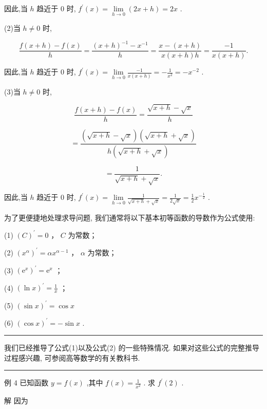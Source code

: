 \documentclass[10pt]{article}
\newcommand{\HRule}{\begin{center}\rule{0.9\linewidth}{0.2mm}\end{center}}
\begin{document}
因此,当 \(h\) 趋近于 0 时, \({f}^{\prime }\left( x\right)  = \mathop{\lim }\limits_{{h \rightarrow  0}}\left( {{2x} + h}\right)  = {2x}\) .

(2)当 \(h \neq  0\) 时,

\[
\frac{f\left( {x + h}\right)  - f\left( x\right) }{h} = \frac{{\left( x + h\right) }^{-1} - {x}^{-1}}{h} = \frac{x - \left( {x + h}\right) }{x\left( {x + h}\right) h} = \frac{-1}{x\left( {x + h}\right) }.
\]

因此,当 \(h\) 趋近于 0 时, \({f}^{\prime }\left( x\right)  = \mathop{\lim }\limits_{{h \rightarrow  0}}\frac{-1}{x\left( {x + h}\right) } =  - \frac{1}{{x}^{2}} =  - {x}^{-2}\) .

(3)当 \(h \neq  0\) 时,

\[
\frac{f\left( {x + h}\right)  - f\left( x\right) }{h} = \frac{\sqrt{x + h} - \sqrt{x}}{h}
\]

\[
= \frac{\left( {\sqrt{x + h} - \sqrt{x}}\right) \left( {\sqrt{x + h} + \sqrt{x}}\right) }{h\left( {\sqrt{x + h} + \sqrt{x}}\right) }
\]

\[
= \frac{1}{\sqrt{x + h} + \sqrt{x}}.
\]

因此,当 \(h\) 趋近于 0 时, \({f}^{\prime }\left( x\right)  = \mathop{\lim }\limits_{{h \rightarrow  0}}\frac{1}{\sqrt{x + h} + \sqrt{x}} = \frac{1}{2\sqrt{x}} = \frac{1}{2}{x}^{-\frac{1}{2}}\) .

为了更便捷地处理求导问题, 我们通常将以下基本初等函数的导数作为公式使用:

(1) \({\left( C\right) }^{\prime } = 0\) ， \(C\) 为常数；

(2) \({\left( {x}^{\alpha }\right) }^{\prime } = \alpha {x}^{\alpha  - 1}\) ， \(\alpha\) 为常数；

(3) \({\left( {\mathrm{e}}^{x}\right) }^{\prime } = {\mathrm{e}}^{x}\) ；

(4) \({\left( \ln x\right) }^{\prime } = \frac{1}{x}\) ；

(5) \({\left( \sin x\right) }^{\prime } = \cos x\)

(6) \({\left( \cos x\right) }^{\prime } =  - \sin x\) .

\HRule

我们已经推导了公式(1)以及公式(2) 的一些特殊情况. 如果对这些公式的完整推导过程感兴趣, 可参阅高等数学的有关教科书.

\HRule

例 4 已知函数 \(y = f\left( x\right)\) ,其中 \(f\left( x\right)  = \frac{1}{{x}^{2}}\) . 求 \({f}^{\prime }\left( 2\right)\) .

解 因为
\end{document}
